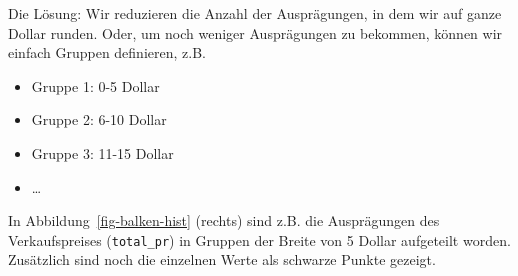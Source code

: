 \documentclass[
  letterpaper,
  twoside,
  open=any]{scrbook}
\providecommand{\tightlist}{%
  \setlength{\itemsep}{0pt}\setlength{\parskip}{0pt}}\usepackage{longtable,booktabs,array}
\theoremstyle{definition}
\theoremstyle{definition}
\theoremstyle{definition}
\theoremstyle{remark}
\begin{document}
Die Lösung: Wir reduzieren die Anzahl der Ausprägungen, in dem wir auf
ganze Dollar runden. Oder, um noch weniger Ausprägungen zu bekommen,
können wir einfach Gruppen definieren, z.B.

\begin{itemize}
\tightlist
\item
  Gruppe 1: 0-5 Dollar
\item
  Gruppe 2: 6-10 Dollar
\item
  Gruppe 3: 11-15 Dollar
\item
  \ldots{}
\end{itemize}

In Abbildung~\ref{fig-balken-hist} (rechts) sind z.B. die Ausprägungen
des Verkaufspreises (\texttt{total\_pr}) in Gruppen der Breite von 5
Dollar aufgeteilt worden. Zusätzlich sind noch die einzelnen Werte als
schwarze Punkte gezeigt.
\end{document}
